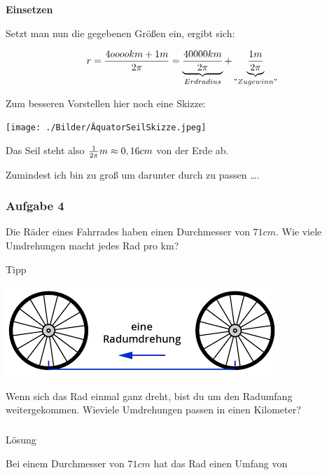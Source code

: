 \documentclass[
  ngerman,
]{book}
\begin{document}
\textbf{Einsetzen}

Setzt man nun die gegebenen Größen ein, ergibt sich:

\[r = {4ooookm + 1m \over 2 \pi} = \underbrace{40000km \over 2\pi}_{Erdradius}+\underbrace{1m \over 2\pi}_{"Zugewinn"}\]

Zum besseren Vorstellen hier noch eine Skizze:

\texttt{[image: ./Bilder/ÄquatorSeilSkizze.jpeg]}

Das Seil steht also \({1 \over 2\pi}m \approx 0,16 cm\) von der Erde ab.

Zumindest ich bin zu groß um darunter durch zu passen \ldots.

\hypertarget{section-31}{%
\subsubsection*{}\label{section-31}}

\hypertarget{aufgabe-4-4}{%
\subsubsection*{Aufgabe 4}\label{aufgabe-4-4}}

Die Räder eines Fahrrades haben einen Durchmesser von \(71cm\). Wie viele Umdrehungen macht jedes Rad pro km?

Tipp

\includegraphics{./Bilder/RadUmdrehung.png}

Wenn sich das Rad einmal ganz dreht, bist du um den Radumfang weitergekommen. Wieviele Umdrehungen passen in einen Kilometer?

\hypertarget{section-32}{%
\subsubsection*{}\label{section-32}}

Lösung

Bei einem Durchmesser von \(71cm\) hat das Rad einen Umfang von
\end{document}
